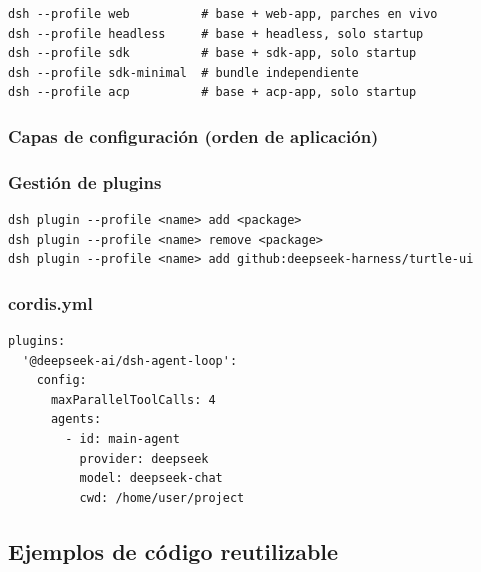 \documentclass[11pt,a4paper]{article}
\begin{document}
\begin{lstlisting}
dsh --profile web          # base + web-app, parches en vivo
dsh --profile headless     # base + headless, solo startup
dsh --profile sdk          # base + sdk-app, solo startup
dsh --profile sdk-minimal  # bundle independiente
dsh --profile acp          # base + acp-app, solo startup
\end{lstlisting}


\subsubsection*{Capas de configuración (orden de aplicación)}




\subsubsection*{Gestión de plugins}


\begin{lstlisting}
dsh plugin --profile <name> add <package>
dsh plugin --profile <name> remove <package>
dsh plugin --profile <name> add github:deepseek-harness/turtle-ui
\end{lstlisting}


\subsubsection*{cordis.yml}


\begin{lstlisting}
plugins:
  '@deepseek-ai/dsh-agent-loop':
    config:
      maxParallelToolCalls: 4
      agents:
        - id: main-agent
          provider: deepseek
          model: deepseek-chat
          cwd: /home/user/project
\end{lstlisting}


\subsection*{Ejemplos de código reutilizable}
\end{document}
